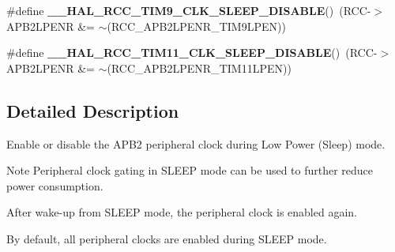 \begin{DoxyCompactItemize}
\item 
\#define {\bfseries \+\_\+\+\_\+\+H\+A\+L\+\_\+\+R\+C\+C\+\_\+\+T\+I\+M9\+\_\+\+C\+L\+K\+\_\+\+S\+L\+E\+E\+P\+\_\+\+D\+I\+S\+A\+B\+LE}()~(R\+CC-\/$>$A\+P\+B2\+L\+P\+E\+NR \&= $\sim$(R\+C\+C\+\_\+\+A\+P\+B2\+L\+P\+E\+N\+R\+\_\+\+T\+I\+M9\+L\+P\+EN))\hypertarget{group___r_c_c___a_p_b2___low_power___enable___disable_ga531cefe824de1fa7461b34030d30d75f}{}\label{group___r_c_c___a_p_b2___low_power___enable___disable_ga531cefe824de1fa7461b34030d30d75f}

\item 
\#define {\bfseries \+\_\+\+\_\+\+H\+A\+L\+\_\+\+R\+C\+C\+\_\+\+T\+I\+M11\+\_\+\+C\+L\+K\+\_\+\+S\+L\+E\+E\+P\+\_\+\+D\+I\+S\+A\+B\+LE}()~(R\+CC-\/$>$A\+P\+B2\+L\+P\+E\+NR \&= $\sim$(R\+C\+C\+\_\+\+A\+P\+B2\+L\+P\+E\+N\+R\+\_\+\+T\+I\+M11\+L\+P\+EN))\hypertarget{group___r_c_c___a_p_b2___low_power___enable___disable_gaf9c48fd8cd99db0e44d5427afe10c383}{}\label{group___r_c_c___a_p_b2___low_power___enable___disable_gaf9c48fd8cd99db0e44d5427afe10c383}

\end{DoxyCompactItemize}


\subsection{Detailed Description}
Enable or disable the A\+P\+B2 peripheral clock during Low Power (Sleep) mode. 

\begin{DoxyNote}{Note}
Peripheral clock gating in S\+L\+E\+EP mode can be used to further reduce power consumption. 

After wake-\/up from S\+L\+E\+EP mode, the peripheral clock is enabled again. 

By default, all peripheral clocks are enabled during S\+L\+E\+EP mode. 
\end{DoxyNote}
